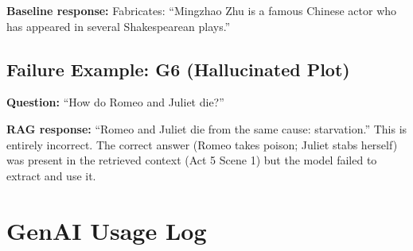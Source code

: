 \documentclass[10pt,conference]{IEEEtran}
\begin{document}
\textbf{Baseline response:} Fabricates: ``Mingzhao Zhu is a famous Chinese actor who has appeared in several Shakespearean plays.''

\subsection{Failure Example: G6 (Hallucinated Plot)}

\textbf{Question:} ``How do Romeo and Juliet die?''

\textbf{RAG response:} ``Romeo and Juliet die from the same cause: starvation.'' This is entirely incorrect. The correct answer (Romeo takes poison; Juliet stabs herself) was present in the retrieved context (Act 5 Scene 1) but the model failed to extract and use it.

\section{GenAI Usage Log}
\label{app:genai-log}
\end{document}
